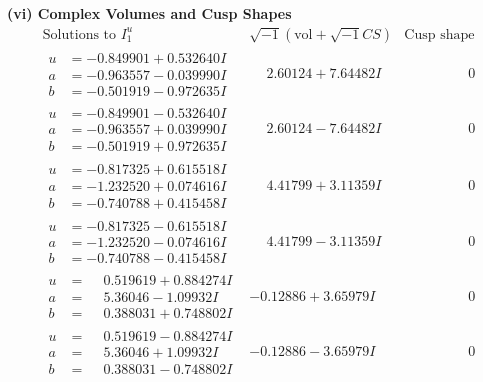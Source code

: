 \documentclass[1p]{elsarticle_modified}
\theoremstyle{definition}
\newcommand{\I}{\sqrt{-1}}
\begin{document}
\newpage\flushleft \textbf{(vi) Complex Volumes and Cusp Shapes}
$$\begin{array}{c|c|c}  
\text{Solutions to }I^u_{1}& \I (\text{vol} + \sqrt{-1}CS) & \text{Cusp shape}\\
 \hline 
\begin{aligned}
u &= -0.849901 + 0.532640 I \\
a &= -0.963557 - 0.039990 I \\
b &= -0.501919 - 0.972635 I\end{aligned}
 & \phantom{-}2.60124 + 7.64482 I & \phantom{-0.000000 } 0 \\ \hline\begin{aligned}
u &= -0.849901 - 0.532640 I \\
a &= -0.963557 + 0.039990 I \\
b &= -0.501919 + 0.972635 I\end{aligned}
 & \phantom{-}2.60124 - 7.64482 I & \phantom{-0.000000 } 0 \\ \hline\begin{aligned}
u &= -0.817325 + 0.615518 I \\
a &= -1.232520 + 0.074616 I \\
b &= -0.740788 + 0.415458 I\end{aligned}
 & \phantom{-}4.41799 + 3.11359 I & \phantom{-0.000000 } 0 \\ \hline\begin{aligned}
u &= -0.817325 - 0.615518 I \\
a &= -1.232520 - 0.074616 I \\
b &= -0.740788 - 0.415458 I\end{aligned}
 & \phantom{-}4.41799 - 3.11359 I & \phantom{-0.000000 } 0 \\ \hline\begin{aligned}
u &= \phantom{-}0.519619 + 0.884274 I \\
a &= \phantom{-}5.36046 - 1.09932 I \\
b &= \phantom{-}0.388031 + 0.748802 I\end{aligned}
 & -0.12886 + 3.65979 I & \phantom{-0.000000 } 0 \\ \hline\begin{aligned}
u &= \phantom{-}0.519619 - 0.884274 I \\
a &= \phantom{-}5.36046 + 1.09932 I \\
b &= \phantom{-}0.388031 - 0.748802 I\end{aligned}
 & -0.12886 - 3.65979 I & \phantom{-0.000000 } 0 \\ \hline\begin{aligned}

\end{aligned}
\end{array}$$
\end{document}
